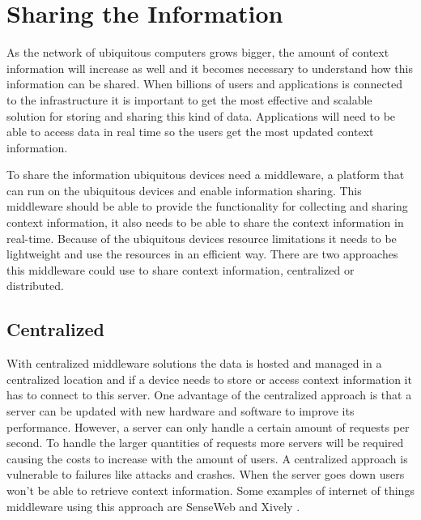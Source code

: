 \section{Sharing the Information}
As the network of ubiquitous computers grows bigger, the amount of context information will increase as well and it becomes necessary to understand how this information can be shared. When billions of users and applications is connected to the infrastructure it is important to get the most effective and scalable solution for storing and sharing this kind of data. Applications will need to be able to access data in real time so the users get the most updated context information. 

To share the information ubiquitous devices need a middleware, a platform that can run on the ubiquitous devices and enable information sharing. This middleware should be able to provide the functionality for collecting and sharing context information, it also needs to be able to share the context information in real-time. Because of the ubiquitous devices resource limitations it needs to be lightweight and use the resources in an efficient way. There are two approaches this middleware could use to share context information, centralized or distributed.

\subsection{Centralized}
With centralized middleware solutions the data is hosted and managed in a centralized location and if a device needs to store or access context information it has to connect to this server. One advantage of the centralized approach is that a server can be updated with new hardware and software to improve its performance. 
However, a server can only handle a certain amount of requests per second. To handle the larger quantities of requests more servers will be required causing the costs to increase with the amount of users. A centralized approach is vulnerable to failures like attacks and crashes. When the server goes down users won't be able to retrieve context information. Some examples of internet of things middleware using this approach are SenseWeb \cite{senseweb} and Xively \cite{xively}.


